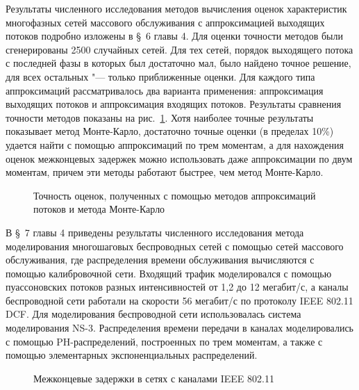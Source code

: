 Результаты численного исследования методов вычисления оценок характеристик многофазных сетей массового обслуживания с аппроксимацией выходящих потоков подробно изложены в \S~6 главы 4. Для оценки точности методов были сгенерированы 2500 случайных сетей. Для тех сетей, порядок выходящего потока с последней фазы в которых был достаточно мал, было найдено точное решение, для всех остальных "--- только приближенные оценки. Для каждого типа аппроксимаций рассматривалось два варианта применения: аппроксимация выходящих потоков и аппроксимация входящих потоков. Результаты сравнения точности методов показаны на рис.~\ref{fig:approximations_summary}. Хотя наиболее точные результаты показывает метод Монте-Карло, достаточно точные оценки (в пределах 10\%) удается найти с помощью аппроксимаций по трем моментам, а для нахождения оценок межконцевых задержек можно использовать даже аппроксимации по двум моментам, причем эти методы работают быстрее, чем метод Монте-Карло.

\begin{figure}[h]
  \caption{Точность оценок, полученных с помощью методов аппроксимаций потоков и метода Монте-Карло}
  \label{fig:approximations_summary}
\end{figure}

В \S~7 главы 4 приведены результаты численного исследования метода моделирования многошаговых беспроводных сетей с помощью сетей массового обслуживания, где распределения времени обслуживания вычисляются с помощью калибровочной сети. Входящий трафик моделировался с помощью пуассоновских потоков разных интенсивностей от 1,2 до 12 мегабит/с, а каналы беспроводной сети работали на скорости 56 мегабит/с по протоколу IEEE 802.11 DCF. Для моделирования беспроводной сети использовалась система моделирования NS-3. Распределения времени передачи в каналах моделировались с помощью PH-распределений, построенных по трем моментам, а также с помощью элементарных экспоненциальных распределений.

\begin{figure}[h]
  \caption{Межконцевые задержки в сетях с каналами IEEE 802.11}\label{fig:tandem_delays}
\end{figure}

